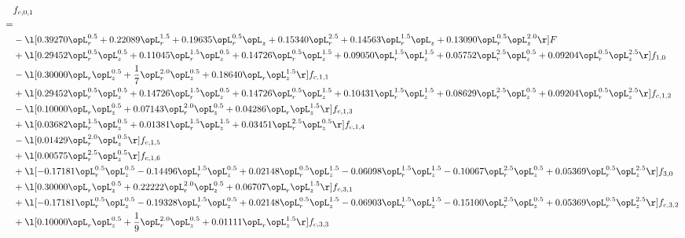 \begin{alignat}{2} 
\label{eq:f_01_2} 
& f_{c,0,1} \nonumber \\ 
 = \\ 
& - \l[  0.39270 \opL_r^{0.5} +  0.22089 \opL_r^{1.5} +  0.19635 \opL_r^{0.5} \opL_z +  0.15340 \opL_r^{2.5} +  0.14563 \opL_r^{1.5} \opL_z +  0.13090 \opL_r^{0.5} \opL_z^{2.0}  \r] F \nonumber \\ 
& + \l[  0.29452 \opL_r^{0.5} \opL_z^{0.5} +  0.11045 \opL_r^{1.5} \opL_z^{0.5} +  0.14726 \opL_r^{0.5} \opL_z^{1.5} +  0.09050 \opL_r^{1.5} \opL_z^{1.5} +  0.05752 \opL_r^{2.5} \opL_z^{0.5} +  0.09204 \opL_r^{0.5} \opL_z^{2.5}  \r] f_{1,0} \nonumber \\ 
& - \l[  0.30000 \opL_r \opL_z^{0.5} + \frac{1}{7} \opL_r^{2.0} \opL_z^{0.5} +  0.18640 \opL_r \opL_z^{1.5}  \r] f_{c,1,1} \nonumber \\ 
& + \l[  0.29452 \opL_r^{0.5} \opL_z^{0.5} +  0.14726 \opL_r^{1.5} \opL_z^{0.5} +  0.14726 \opL_r^{0.5} \opL_z^{1.5} +  0.10431 \opL_r^{1.5} \opL_z^{1.5} +  0.08629 \opL_r^{2.5} \opL_z^{0.5} +  0.09204 \opL_r^{0.5} \opL_z^{2.5}  \r] f_{c,1,2} \nonumber \\ 
& - \l[  0.10000 \opL_r \opL_z^{0.5} +  0.07143 \opL_r^{2.0} \opL_z^{0.5} +  0.04286 \opL_r \opL_z^{1.5}  \r] f_{c,1,3} \nonumber \\ 
& + \l[  0.03682 \opL_r^{1.5} \opL_z^{0.5} +  0.01381 \opL_r^{1.5} \opL_z^{1.5} +  0.03451 \opL_r^{2.5} \opL_z^{0.5}  \r] f_{c,1,4} \nonumber \\ 
& - \l[  0.01429 \opL_r^{2.0} \opL_z^{0.5}  \r] f_{c,1,5} \nonumber \\ 
& + \l[  0.00575 \opL_r^{2.5} \opL_z^{0.5}  \r] f_{c,1,6} \nonumber \\ 
& + \l[  -0.17181 \opL_r^{0.5} \opL_z^{0.5}   -0.14496 \opL_r^{1.5} \opL_z^{0.5} +  0.02148 \opL_r^{0.5} \opL_z^{1.5}   -0.06098 \opL_r^{1.5} \opL_z^{1.5}   -0.10067 \opL_r^{2.5} \opL_z^{0.5} +  0.05369 \opL_r^{0.5} \opL_z^{2.5}  \r] f_{3,0} \nonumber \\ 
& + \l[  0.30000 \opL_r \opL_z^{0.5} +  0.22222 \opL_r^{2.0} \opL_z^{0.5} +  0.06707 \opL_r \opL_z^{1.5}  \r] f_{c,3,1} \nonumber \\ 
& + \l[  -0.17181 \opL_r^{0.5} \opL_z^{0.5}   -0.19328 \opL_r^{1.5} \opL_z^{0.5} +  0.02148 \opL_r^{0.5} \opL_z^{1.5}   -0.06903 \opL_r^{1.5} \opL_z^{1.5}   -0.15100 \opL_r^{2.5} \opL_z^{0.5} +  0.05369 \opL_r^{0.5} \opL_z^{2.5}  \r] f_{c,3,2} \nonumber \\ 
& + \l[  0.10000 \opL_r \opL_z^{0.5} + \frac{1}{9} \opL_r^{2.0} \opL_z^{0.5} +  0.01111 \opL_r \opL_z^{1.5}  \r] f_{c,3,3} \nonumber \\ 

\end{alignat}
